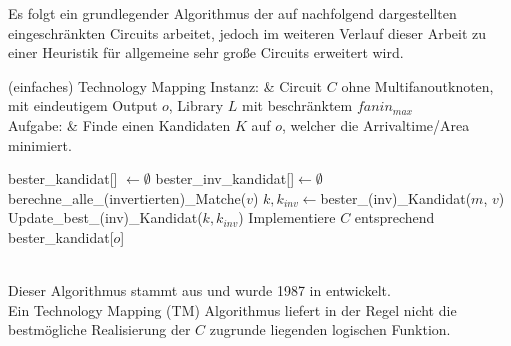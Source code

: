 \documentclass[11pt, a4paper, german]{article}
\newcommand{\TM}{Technology  Mapping }
\begin{document}
Es folgt ein grundlegender Algorithmus der auf nachfolgend dargestellten eingeschränkten Circuits arbeitet, jedoch im weiteren Verlauf dieser Arbeit zu einer Heuristik für allgemeine sehr große Circuits erweitert wird.

\begin{problem}[framed]{(einfaches) Technology Mapping}
  Instanz:  & Circuit $C$ ohne Multifanoutknoten, mit eindeutigem Output $o$, Library $L$ mit beschr\"anktem $fanin_{max}$\\
  Aufgabe: &  Finde einen Kandidaten $K$ auf $o$, welcher die Arrivaltime/Area minimiert.
\end{problem}
\begin{algorithm}[H]
 \LinesNumbered
 \DontPrintSemicolon
 \caption{(einfaches) Technology Mapping}

 bester\_kandidat[] $\gets \emptyset$\;
 bester\_inv\_kandidat[]$ \gets \emptyset$\;
 {
   berechne\_alle\_(invertierten)\_Matche($v$)\;
   {
      $k,k_{inv} \gets $bester\_(inv)\_Kandidat($m$, $v$)\;
      Update\_best\_(inv)\_Kandidat($k,k_{inv}$)\;
   }
 }
 Implementiere $C$ entsprechend bester\_kandidat[$o$]\;
\end{algorithm}\ \\

Dieser Algorithmus stammt aus \cite{Elbert} und wurde 1987 in \cite{DAGON} entwickelt.\\
Ein \TM (TM) Algorithmus liefert in der Regel nicht die bestmögliche Realisierung der $C$ zugrunde liegenden logischen Funktion.\\
\end{document}
